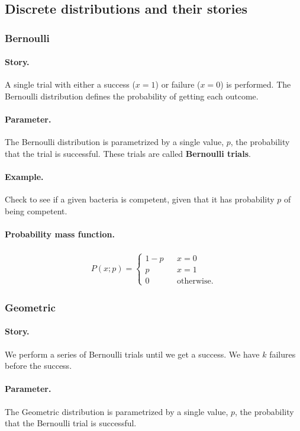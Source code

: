 \subsection{Discrete distributions and their stories}

\subsubsection{Bernoulli}
\paragraph{Story.} A single trial with either a success ($x = 1$) or
failure ($x=0$) is performed.  The Bernoulli distribution defines the
probability of getting each outcome.
\paragraph{Parameter.} The Bernoulli distribution is parametrized by a
single value, $p$, the probability that the trial is successful.
These trials are called \textbf{Bernoulli trials}.
\paragraph{Example.} Check to see if a given bacteria is competent,
given that it has probability $p$ of being competent.
\paragraph{Probability mass function.}
\begin{align}
P(x;p) = \left\{ \begin{array}{ccc}
1-p & & x = 0 \\[0.5em]
p & & x = 1 \\[0.5em]
0 & & \text{otherwise.}
\end{array}
\right.
\end{align}


\subsubsection{Geometric}
\paragraph{Story.} We perform a series of Bernoulli trials until we
get a success.  We have $k$ failures before the success.
\paragraph{Parameter.} The Geometric distribution is parametrized by a
single value, $p$, the probability that the Bernoulli trial is
successful.
